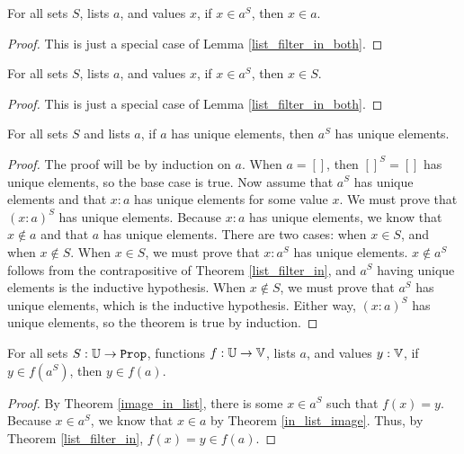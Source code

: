 \documentclass[../../math.tex]{subfiles}
\begin{document}
\begin{theorem} \label{list_filter_in}
    For all sets $S$, lists $a$, and values $x$, if $x \in a^S$, then $x \in a$.
\end{theorem}
\begin{proof}
    This is just a special case of Lemma \ref{list_filter_in_both}.
\end{proof}

\begin{theorem} \label{list_filter_in_set}
    For all sets $S$, lists $a$, and values $x$, if $x \in a^S$, then $x \in S$.
\end{theorem}
\begin{proof}
    This is just a special case of Lemma \ref{list_filter_in_both}.
\end{proof}

\begin{theorem} \label{list_filter_unique}
    For all sets $S$ and lists $a$, if $a$ has unique elements, then $a^S$ has
    unique elements.
\end{theorem}
\begin{proof}
    The proof will be by induction on $a$.  When $a = []$, then $[]^S = []$ has
    unique elements, so the base case is true.  Now assume that $a^S$ has unique
    elements and that $x : a$ has unique elements for some value $x$.  We must
    prove that $(x : a)^S$ has unique elements.  Because $x : a$ has unique
    elements, we know that $x \notin a$ and that $a$ has unique elements.  There
    are two cases: when $x \in S$, and when $x \notin S$.  When $x \in S$, we
    must prove that $x : a^S$ has unique elements.  $x \notin a^S$ follows from
    the contrapositive of Theorem \ref{list_filter_in}, and $a^S$ having unique
    elements is the inductive hypothesis.  When $x \notin S$, we must prove that
    $a^S$ has unique elements, which is the inductive hypothesis.  Either way,
    $(x : a)^S$ has unique elements, so the theorem is true by induction.
\end{proof}

\begin{theorem} \label{list_filter_image_in}
    For all sets $S : \set{\U}$, functions $f : \mathbb{U} \to \mathbb{V}$, lists $a$, and
    values $y : \mathbb{V}$, if $y \in f(a^S)$, then $y \in f(a)$.
\end{theorem}
\begin{proof}
    By Theorem \ref{image_in_list}, there is some $x \in a^S$ such that $f(x) =
    y$.  Because $x \in a^S$, we know that $x \in a$ by Theorem
    \ref{in_list_image}.  Thus, by Theorem \ref{list_filter_in}, $f(x) = y \in
    f(a)$.
\end{proof}
\end{document}
